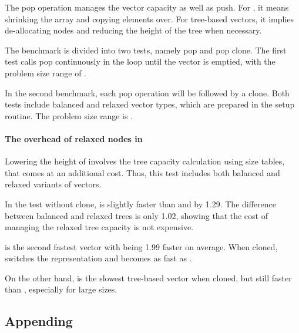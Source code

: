 The pop operation manages the vector capacity as well as push. For \stdvec{}, it means shrinking the array and copying elements over. For tree-based vectors, it implies de-allocating nodes and reducing the height of the tree when necessary.

The benchmark is divided into two tests, namely pop and pop clone. The first test calls pop continuously in the loop until the vector is emptied, with the problem size range of \range{[20, \kilo{60}]}.

In the second benchmark, each pop operation will be followed by a clone. Both tests include balanced and relaxed vector types, which are prepared in the setup routine. The problem size range is \range{[20, \kilo{40}]}.

\paragraph{The overhead of relaxed nodes in \rrbtree{}}
Lowering the height of \rrbtree{} involves the tree capacity calculation using size tables, that comes at an additional cost. Thus, this test includes both balanced and relaxed variants of vectors.

In the test without clone, \imrsvec{} is slightly faster than \rbvec{} and \rrbvec{} by 1.29. The difference between balanced and relaxed trees is only 1.02, showing that the cost of managing the relaxed tree capacity is not expensive.

\pvec{} is the second fastest vector with \stdvec{} being 1.99 faster on average. When cloned, \pvec{} switches the representation and becomes as fast as \rbvec{}.

On the other hand, \imrsvec{} is the slowest tree-based vector when cloned, but still faster than \stdvec{}, especially for large sizes.

\subsection{Appending}

